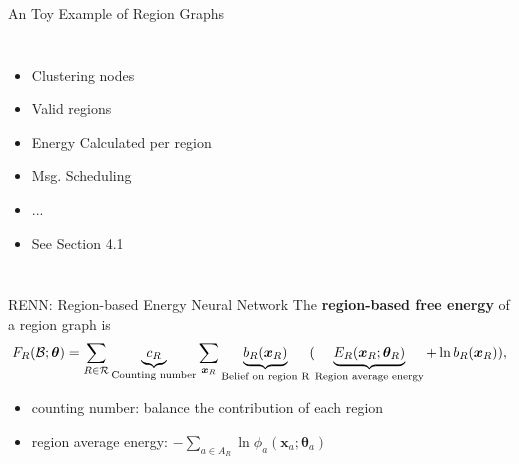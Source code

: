 \begin{frame}{An Toy Example of Region Graphs}
\begin{columns}
\begin{tikzpicture}
    \end{tikzpicture}
    \begin{itemize}[label=\textbullet]
    \item Clustering nodes
    \item Valid regions
    \item Energy Calculated per region
    \item Msg. Scheduling
    \item ...
    \item See Section 4.1
      
    \end{itemize}
  \end{columns}

  
\end{frame}
\begin{frame}{RENN: Region-based Energy Neural Network}
  The \textbf{region-based free energy} of a region graph is
  \begin{equation*}
    F_R(\Bb; \bm{\theta}) = \sum_{R\in \Rr} \underbrace{c_R}_{\text{Counting number}} \sum_{\bm{x}_R}\underbrace{b_R(\bm{x}_R)}_{\text{Belief on region R}} (\underbrace{E_R(\bm{x}_R; \bm{\theta}_R)}_{\text{Region average energy}} + \ln{b_R}(\bm{x}_R)),
  \end{equation*}
  \begin{itemize}[label=$\bullet$]
  \item counting number: balance the contribution of each region
  \item region average energy: $- \sum_{a\in A_R} \ln{\phi_a(\bm{x}_a; \bm{\theta}_a)}$
  \end{itemize}
  
  
  
  \begin{columns}
    \centering
\end{columns}
\end{frame}
